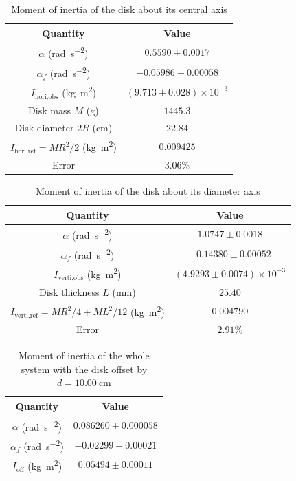 \begin{table}[htb!]
\centering
\caption{Moment of inertia of the disk about its central axis}
\begin{tabular}{cc}
\toprule
Quantity & Value \\
\midrule
$\alpha$ (\unit{\radian\per\s\squared}) & $0.5590 \pm 0.0017$ \\
$\alpha_{f}$ (\unit{\radian\per\s\squared}) & $-0.05986 \pm 0.00058$ \\
$I_{\text{hori,obs}}$ (\unit{\kg\m\squared}) & $(9.713 \pm 0.028)\times 10^{-3}$ \\
Disk mass $M$ (\unit{\g}) & $1445.3$ \\
Disk diameter $2R$ (\unit{\cm}) & $22.84$ \\
$I_{\text{hori,ref}}=MR^{2}/2$ (\unit{\kg\m\squared}) & $0.009425$ \\
Error & $3.06\%$ \\
\bottomrule
\end{tabular}
\end{table}
\begin{table}[htb!]
\centering
\caption{Moment of inertia of the disk about its diameter axis}
\begin{tabular}{cc}
\toprule
Quantity & Value \\
\midrule
$\alpha$ (\unit{\radian\per\s\squared}) & $1.0747 \pm 0.0018$ \\
$\alpha_{f}$ (\unit{\radian\per\s\squared}) & $-0.14380 \pm 0.00052$ \\
$I_{\text{verti,obs}}$ (\unit{\kg\m\squared}) & $(4.9293 \pm 0.0074)\times 10^{-3}$ \\
Disk thickness $L$ (\unit{\mm}) & $25.40$ \\
$I_{\text{verti,ref}}=MR^{2}/4+ML^{2}/12$ (\unit{\kg\m\squared}) & $0.004790$ \\
Error & $2.91\%$ \\
\bottomrule
\end{tabular}
\end{table}
\begin{table}[htb!]
\centering
\caption{Moment of inertia of the whole system with the disk offset by $d=\qty{10.00}{\cm}$}
\begin{tabular}{cc}
\toprule
Quantity & Value \\
\midrule
$\alpha$ (\unit{\radian\per\s\squared}) & $0.086260 \pm 0.000058$ \\
$\alpha_{f}$ (\unit{\radian\per\s\squared}) & $-0.02299 \pm 0.00021$ \\
$I_{\text{off}}$ (\unit{\kg\m\squared}) & $0.05494 \pm 0.00011$ \\
\bottomrule
\end{tabular}
\end{table}
